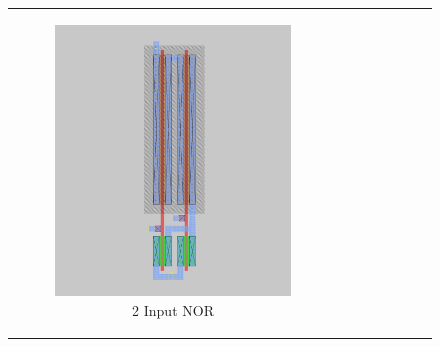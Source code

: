 \documentclass[conference]{IEEEtran}
\begin{document}
\begin{figure}[H]
    \centering
    \begin{tabular}{cc}
        \begin{subfigure}{0.44\linewidth}
            \centering
            \includegraphics[width=\textwidth]{images/nor_cmos_layout.png}
            \caption{2 Input NOR}
        \end{subfigure} &
        \begin{subfigure}{0.44\linewidth}
            \centering

\end{subfigure}
\end{tabular}
\end{figure}
\end{document}
